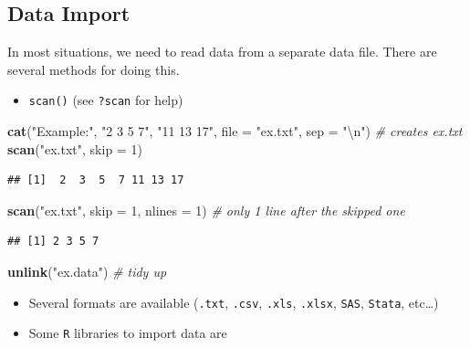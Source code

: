 \documentclass[]{article}
\def\tightlist{}
\newenvironment{Shaded}{\begin{snugshade}}{\end{snugshade}}
\newcommand{\KeywordTok}[1]{\textcolor[rgb]{0.13,0.29,0.53}{\textbf{{#1}}}}
\newcommand{\DataTypeTok}[1]{\textcolor[rgb]{0.13,0.29,0.53}{{#1}}}
\newcommand{\DecValTok}[1]{\textcolor[rgb]{0.00,0.00,0.81}{{#1}}}
\newcommand{\CharTok}[1]{\textcolor[rgb]{0.31,0.60,0.02}{{#1}}}
\newcommand{\StringTok}[1]{\textcolor[rgb]{0.31,0.60,0.02}{{#1}}}
\newcommand{\CommentTok}[1]{\textcolor[rgb]{0.56,0.35,0.01}{\textit{{#1}}}}
\newcommand{\NormalTok}[1]{{#1}}
\numberwithin{equation}{section}
\begin{document}
\subsection{Data Import}\label{data-import}

In most situations, we need to read data from a separate data file.
There are several methods for doing this.

\begin{itemize}
\tightlist
\item
  \texttt{scan()} (see \texttt{?scan} for help)
\end{itemize}

\begin{Shaded}
\begin{Highlighting}[]
\KeywordTok{cat}\NormalTok{(}\StringTok{"Example:"}\NormalTok{, }\StringTok{"2 3 5 7"}\NormalTok{, }\StringTok{"11 13 17"}\NormalTok{, }\DataTypeTok{file =} \StringTok{"ex.txt"}\NormalTok{, }\DataTypeTok{sep =} \StringTok{"}\CharTok{\textbackslash{}n}\StringTok{"}\NormalTok{) }\CommentTok{# creates ex.txt}
\KeywordTok{scan}\NormalTok{(}\StringTok{"ex.txt"}\NormalTok{, }\DataTypeTok{skip =} \DecValTok{1}\NormalTok{)}
\end{Highlighting}
\end{Shaded}

\begin{verbatim}
## [1]  2  3  5  7 11 13 17
\end{verbatim}

\begin{Shaded}
\begin{Highlighting}[]
\KeywordTok{scan}\NormalTok{(}\StringTok{"ex.txt"}\NormalTok{, }\DataTypeTok{skip =} \DecValTok{1}\NormalTok{, }\DataTypeTok{nlines =} \DecValTok{1}\NormalTok{) }\CommentTok{# only 1 line after the skipped one}
\end{Highlighting}
\end{Shaded}

\begin{verbatim}
## [1] 2 3 5 7
\end{verbatim}

\begin{Shaded}
\begin{Highlighting}[]
\KeywordTok{unlink}\NormalTok{(}\StringTok{"ex.data"}\NormalTok{) }\CommentTok{# tidy up}
\end{Highlighting}
\end{Shaded}

\begin{itemize}
\item
  Several formats are available (\texttt{.txt}, \texttt{.csv},
  \texttt{.xls}, \texttt{.xlsx}, \texttt{SAS}, \texttt{Stata},
  etc\ldots{})
\item
  Some \texttt{R} libraries to import data are
\end{itemize}
\end{document}
